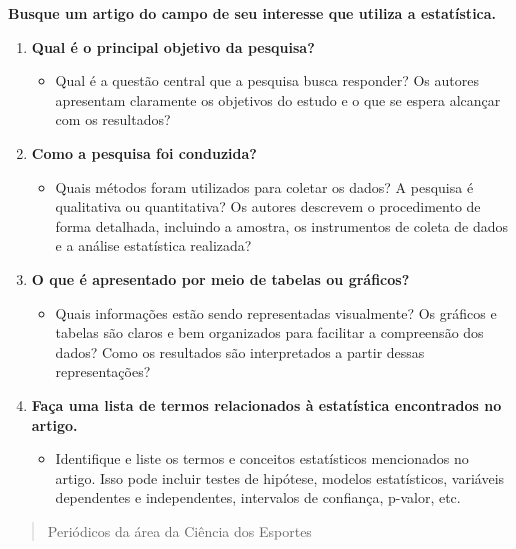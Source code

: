 \documentclass[
]{book}
\providecommand{\tightlist}{%
  \setlength{\itemsep}{0pt}\setlength{\parskip}{0pt}}
\begin{document}
\textbf{Busque um artigo do campo de seu interesse que utiliza a estatística.}

\begin{enumerate}
\def\labelenumi{\arabic{enumi}.}
\tightlist
\item
  \textbf{Qual é o principal objetivo da pesquisa?}

  \begin{itemize}
  \tightlist
  \item
    Qual é a questão central que a pesquisa busca responder? Os autores apresentam claramente os objetivos do estudo e o que se espera alcançar com os resultados?
  \end{itemize}
\item
  \textbf{Como a pesquisa foi conduzida?}

  \begin{itemize}
  \tightlist
  \item
    Quais métodos foram utilizados para coletar os dados? A pesquisa é qualitativa ou quantitativa? Os autores descrevem o procedimento de forma detalhada, incluindo a amostra, os instrumentos de coleta de dados e a análise estatística realizada?
  \end{itemize}
\item
  \textbf{O que é apresentado por meio de tabelas ou gráficos?}

  \begin{itemize}
  \tightlist
  \item
    Quais informações estão sendo representadas visualmente? Os gráficos e tabelas são claros e bem organizados para facilitar a compreensão dos dados? Como os resultados são interpretados a partir dessas representações?
  \end{itemize}
\item
  \textbf{Faça uma lista de termos relacionados à estatística encontrados no artigo.}

  \begin{itemize}
  \tightlist
  \item
    Identifique e liste os termos e conceitos estatísticos mencionados no artigo. Isso pode incluir testes de hipótese, modelos estatísticos, variáveis dependentes e independentes, intervalos de confiança, p-valor, etc.
  \end{itemize}
\end{enumerate}

\begin{quote}
Periódicos da área da Ciência dos Esportes
\end{quote}
\end{document}
